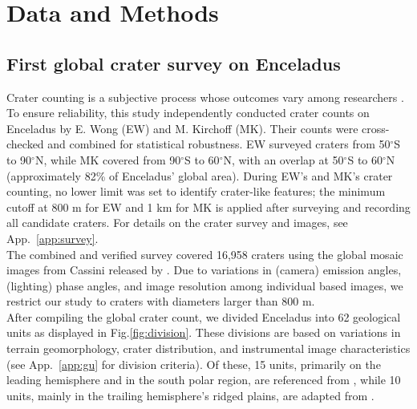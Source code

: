 \documentclass[preprint,12pt,3p,times,authoryear]{elsarticle}
\begin{document}

\section{Data and Methods}
\label{sec:data}

\subsection{First global crater survey on Enceladus}
\label{subsec:crater_count}
Crater counting is a subjective process whose outcomes vary among researchers \citep{Robbins2014}. To ensure reliability, this study independently conducted crater counts on Enceladus by E. Wong (EW) and M. Kirchoff (MK). Their counts were cross-checked and combined for statistical robustness. EW surveyed craters from 50$^\circ$S to 90$^\circ$N, while MK covered from 90$^\circ$S to 60$^\circ$N, with an overlap at 50$^\circ$S to 60$^\circ$N (approximately 82\% of Enceladus' global area). During EW’s and MK’s crater counting, no lower limit was set to identify crater-like features; the minimum cutoff at 800 m for EW and 1 km for MK is applied after surveying and recording all candidate craters. For details on the crater survey and images, see App.~\ref{app:survey}.\\

The combined and verified survey covered 16,958 craters using the global mosaic images from Cassini released by \citet{Bland2018}. Due to variations in (camera) emission angles, (lighting) phase angles, and image resolution among individual based images, we restrict our study to craters with diameters larger than 800 m. \\

After compiling the global crater count, we divided Enceladus into 62 geological units as displayed in  Fig.\ref{fig:division}. These divisions are based on variations in terrain geomorphology, crater distribution, and instrumental image characteristics (see App.~\ref{app:gu} for division criteria).
Of these, 15 units, primarily on the leading hemisphere and in the south polar region, are referenced from \citet{CrowWillard2015}, while 10 units, mainly in the trailing hemisphere’s ridged plains, are adapted from \citet{Kirchoff2009}. \\
\end{document}
